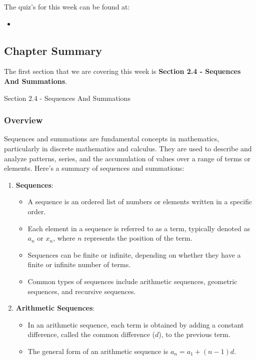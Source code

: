 The quiz's for this week can be found at:

\begin{itemize}
    \item {}
\end{itemize}

\newpage

\subsection{Chapter Summary}

The first section that we are covering this week is \textbf{Section 2.4 - Sequences And Summations}.

\begin{notes}{Section 2.4 - Sequences And Summations}
    \subsubsection*{Overview}

    Sequences and summations are fundamental concepts in mathematics, particularly in discrete mathematics and calculus. They are used to describe and analyze patterns, series, and the accumulation 
    of values over a range of terms or elements. Here's a summary of sequences and summations:

    \begin{enumerate}[label=\arabic*.]
        \item \textbf{Sequences}:
        \begin{itemize}
            \item A sequence is an ordered list of numbers or elements written in a specific order.
            \item Each element in a sequence is referred to as a term, typically denoted as $a_n$ or $x_n$, where $n$ represents the position of the term.
            \item Sequences can be finite or infinite, depending on whether they have a finite or infinite number of terms.
            \item Common types of sequences include arithmetic sequences, geometric sequences, and recursive sequences.
        \end{itemize}
        
        \item \textbf{Arithmetic Sequences}:
        \begin{itemize}
            \item In an arithmetic sequence, each term is obtained by adding a constant difference, called the common difference ($d$), to the previous term.
            \item The general form of an arithmetic sequence is $a_n = a_1 + (n - 1)d$.
        \end{itemize}
        

\end{enumerate}
\end{notes}
